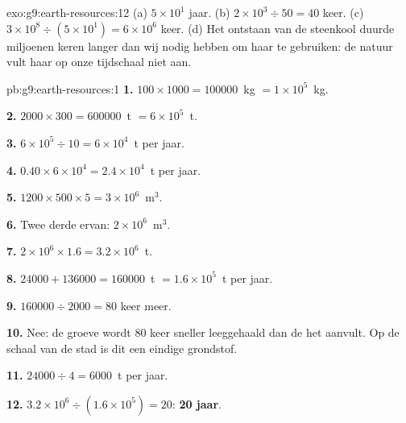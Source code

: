 \begin{solution}{exo:g9:earth-resources:12}
(a) $5 \times 10^1$ jaar. (b) $2 \times 10^3 \div 50 = 40$ keer. (c) $3
\times 10^8 \div (5 \times 10^1) = 6 \times 10^6$ keer. (d) Het ontstaan
van de steenkool duurde miljoenen keren langer dan wij nodig hebben om
haar te gebruiken: de natuur vult haar op onze tijdschaal niet aan.
\end{solution}

\begin{solution}{pb:g9:earth-resources:1}
\textbf{1.} $100 \times 1000 = \num{100000}$~kg $= 1 \times 10^5$~kg.

\textbf{2.} $2000 \times 300 = \num{600000}$~t $= 6 \times 10^5$~t.

\textbf{3.} $6 \times 10^5 \div 10 = 6 \times 10^4$~t per jaar.

\textbf{4.} $0.40 \times 6 \times 10^4 = 2.4 \times 10^4$~t  per
jaar.

\textbf{5.} $1200 \times 500 \times 5 = 3 \times 10^6$~m$^3$.

\textbf{6.} Twee derde ervan: $2 \times 10^6$~m$^3$.

\textbf{7.} $2 \times 10^6 \times 1.6 = 3.2 \times 10^6$~t.

\textbf{8.} $\num{24000} + \num{136000} = \num{160000}$~t $= 1.6 \times
10^5$~t per jaar.

\textbf{9.} $\num{160000} \div 2000 = 80$ keer meer.

\textbf{10.} Nee: de groeve wordt 80 keer sneller leeggehaald dan de 
het  aanvult. Op de schaal van de stad is dit  een eindige
grondstof.

\textbf{11.} $\num{24000} \div 4 = \num{6000}$~t  per jaar.

\textbf{12.} $3.2 \times 10^6 \div (1.6 \times 10^5) = 20$: \textbf{20 jaar}.
\end{solution}
